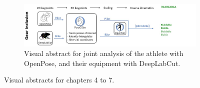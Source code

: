 \begin{figure}[!htp]
\begin{subfigure}[b]{1\textwidth}
            \label{fig_visabstract4_1}
	\end{subfigure}
      \vskip 0.8cm
      \begin{subfigure}[b]{1\textwidth}
            \centering
            \def\svgwidth{1\columnwidth}
            \fontsize{10pt}{10pt}\selectfont
            \includegraphics[width=\linewidth]{"../Intro/Figures/Fig_VisAbstract5.JPG"}
            \caption{Visual abstract for joint analysis of the athlete with OpenPose, and their equipment with DeepLabCut.}
            \label{fig_visabstract5_1}
	\end{subfigure}
	\vskip 0.8cm
	\caption{Visual abstracts for chapters 4 to 7.}
	\label{fig_visabstract}
\end{figure}


